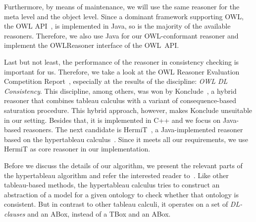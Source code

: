 Furthermore, by means of maintenance, we will use the same reasoner for the meta level and the
object level.
%
Since a dominant framework supporting OWL, the OWL API~\cite{HoB-SW11}, is implemented in Java, so is the
majority of the available reasoners. Therefore, we also use Java for our OWL-conformant reasoner and
implement the \textsf{OWLReasoner} interface of the OWL~API.

Last but not least, the performance of the reasoner in consistency checking is important for
us. Therefore, we take a look at the OWL Reasoner Evaluation Competition
Report~\cite{PaMGGS-SSWS15}, especially at the results of the discipline: \emph{OWL DL
  Consistency}. This discipline, among others, was won by Konclude~\cite{StLG-JWS14}, a
 hybrid reasoner that combines tableau calculus with a variant of consequence-based
saturation procedure. This hybrid approach, however, makes Konclude unsuitable in our
setting. Besides that, it is implemented in C++ and we focus on Java-based reasoners. The
next candidate is HermiT~\cite{GHM-JAR14}, a Java-implemented reasoner based on the hypertableau
calculus~\cite{MoSH-JAIR09}. Since it meets all our requirements, we use HermiT as core reasoner in
our implementation.





Before we discuss the details of our algorithm, we present the relevant parts of the
hypertableau algorithm and refer the interested reader
to~\cite{MoSH-CADE07,MoSH-DL07,MoSH-JAIR09}. Like other tableau-based methods, the hypertableau
calculus tries to construct an abstraction of a model for a given ontology to check whether that
ontology is consistent. But in contrast to other tableau calculi, it operates on a set of
\emph{DL-clauses} and an ABox, instead of a TBox and an ABox.

